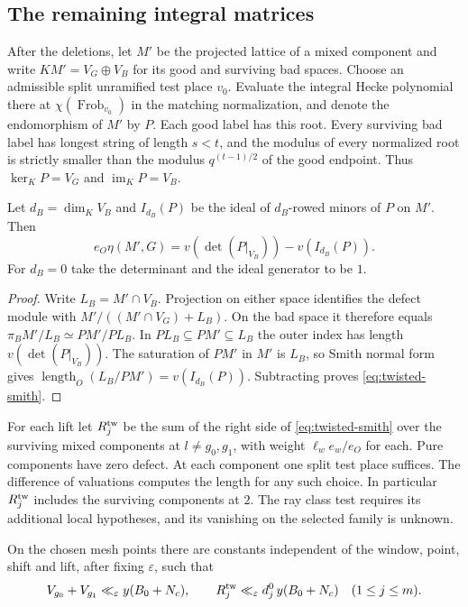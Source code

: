 \subsection{The remaining integral matrices}

After the deletions, let $M'$ be the projected lattice of a mixed
component and write $KM'=V_G\oplus V_B$ for its good and surviving
bad spaces. Choose an admissible split unramified test place $v_0$.
Evaluate the integral Hecke polynomial there at
$\chi(\operatorname{Frob}_{v_0})$ in the matching normalization,
and denote the endomorphism of $M'$ by $P$. Each good label has this
root. Every surviving bad label has longest string of length $s<t$,
and the modulus of every normalized root is strictly smaller than
the modulus $q^{(t-1)/2}$ of the good endpoint. Thus
$\ker_K P=V_G$ and $\operatorname{im}_K P=V_B$.

\begin{lemma}\label{lem:twisted-smith}
Let $d_B=\dim_K V_B$ and $I_{d_B}(P)$ be the ideal of $d_B$-rowed
minors of $P$ on $M'$. Then
\begin{equation}\label{eq:twisted-smith}
 e_O\eta(M',G)=v(\det(P|_{V_B}))-v(I_{d_B}(P)).
\end{equation}
For $d_B=0$ take the determinant and the ideal generator to be $1$.
\end{lemma}

\begin{proof}
Write $L_B=M'\cap V_B$. Projection on either space identifies the
defect module with $M'/((M'\cap V_G)+L_B)$. On the bad space it
therefore equals $\pi_B M'/L_B\simeq PM'/P L_B$. In
$P L_B\subseteq PM'\subseteq L_B$ the outer index has length
$v(\det(P|_{V_B}))$. The saturation of $PM'$ in $M'$ is $L_B$, so
Smith normal form gives $\operatorname{length}_O(L_B/PM')=v(I_{d_B}(P))$.
Subtracting proves \eqref{eq:twisted-smith}.
\end{proof}

For each lift let $R_j^{\rm tw}$ be the sum of the right side of
\eqref{eq:twisted-smith} over the surviving mixed components at
$l\ne g_0,g_1$, with weight $\ell_we_w/e_O$ for each. Pure
components have zero defect. At each component one split test place
suffices. The difference of valuations computes the length for any
such choice. In particular $R_j^{\rm tw}$ includes the surviving
components at $2$. The ray class test requires its additional local
hypotheses, and its vanishing on the selected family is unknown.

\begin{hypothesis}[\openinput]\label{hyp:twisted-residual}
On the chosen mesh points there are constants independent of the
window, point, shift and lift, after fixing $\varepsilon$, such that
\[
 V_{g_0}+V_{g_1}\ll_\varepsilon y(B_0+N_c),\qquad
 R_j^{\rm tw}\ll_\varepsilon d_j^0\, y(B_0+N_c)\quad(1\le j\le m).
\]
\end{hypothesis}

